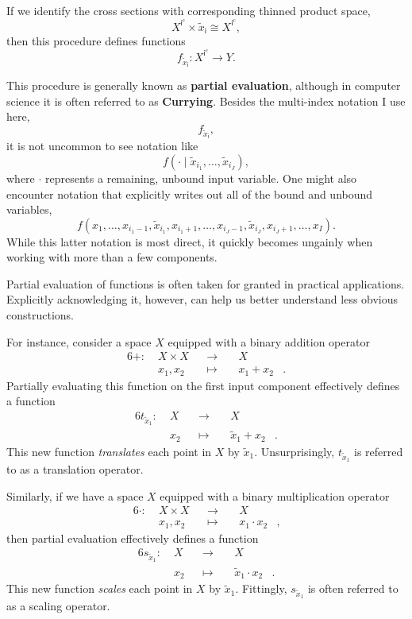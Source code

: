 \documentclass[
  letterpaper,
  DIV=11,
  numbers=noendperiod]{scrartcl}
\begin{document}
If we identify the cross sections with corresponding thinned product
space, \[
X^{ \mathsf{i}^{c} } \times \tilde{x}_{ \mathsf{i} }
\cong
X^{ \mathsf{i}^{c} },
\] then this procedure defines functions \[
f_{ \tilde{x}_{ \mathsf{i} } } :
X^{ \mathsf{i}^{c} } \rightarrow Y.
\]

This procedure is generally known as \textbf{partial evaluation},
although in computer science it is often referred to as
\textbf{Currying}. Besides the multi-index notation I use here, \[
f_{ \tilde{x}_{ \mathsf{i} } },
\] it is not uncommon to see notation like \[
f(\cdot \mid \tilde{x}_{i_{1}}, \ldots, \tilde{x}_{i_{J}}),
\] where \(\cdot\) represents a remaining, unbound input variable. One
might also encounter notation that explicitly writes out all of the
bound and unbound variables, \[
f(
  x_{1}, \ldots,
  x_{i_{1} - 1}, \tilde{x}_{i_{1}}, x_{i_{1} + 1}, \ldots,
  x_{i_{J} - 1}, \tilde{x}_{i_{J}}, x_{i_{J} + 1}, \ldots,
  x_{I}
).
\] While this latter notation is most direct, it quickly becomes
ungainly when working with more than a few components.

Partial evaluation of functions is often taken for granted in practical
applications. Explicitly acknowledging it, however, can help us better
understand less obvious constructions.

For instance, consider a space \(X\) equipped with a binary addition
operator \begin{alignat*}{6}
+ :\; & X \times X& &\rightarrow& \; & X &
\\
& x_{1}, x_{2} & &\mapsto& & x_{1} + x_{2} &.
\end{alignat*} Partially evaluating this function on the first input
component effectively defines a function \begin{alignat*}{6}
t_{\tilde{x}_{1}} :\; &X& &\rightarrow& \; & X &
\\
& x_{2} & &\mapsto& & \tilde{x}_{1} + x_{2} &.
\end{alignat*} This new function \emph{translates} each point in \(X\)
by \(\tilde{x}_{1}\). Unsurprisingly, \(t_{\tilde{x}_{1}}\) is referred
to as a translation operator.

Similarly, if we have a space \(X\) equipped with a binary
multiplication operator \begin{alignat*}{6}
\cdot :\; & X \times X& &\rightarrow& \; & X &
\\
& x_{1}, x_{2} & &\mapsto& & x_{1} \cdot x_{2} &,
\end{alignat*} then partial evaluation effectively defines a function
\begin{alignat*}{6}
s_{\tilde{x}_{1}} :\; &X& &\rightarrow& \; & X &
\\
& x_{2} & &\mapsto& & \tilde{x}_{1} \cdot x_{2} &.
\end{alignat*} This new function \emph{scales} each point in \(X\) by
\(\tilde{x}_{1}\). Fittingly, \(s_{\tilde{x}_{1}}\) is often referred to
as a scaling operator.
\end{document}
